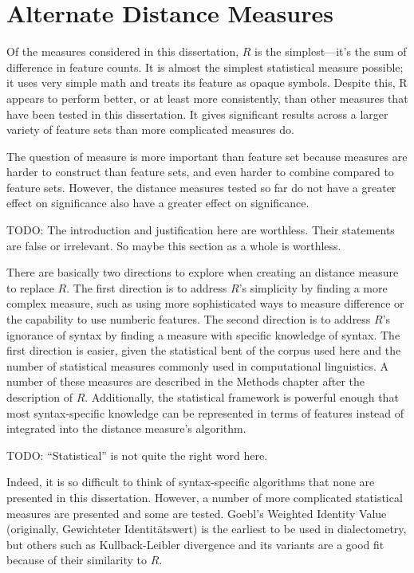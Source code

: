 \section{Alternate Distance Measures}

Of the measures considered in this dissertation, $R$ is the
simplest---it's the sum of difference in feature counts. It is almost
the simplest statistical measure possible; it uses very simple math
and treats its feature as opaque symbols.  Despite this, R appears to
perform better, or at least more consistently, than other measures
that have been tested in this dissertation. It gives significant
results across a larger variety of feature sets than more complicated
measures do.

The question of measure is more important than feature set because
measures are harder to construct than feature sets, and even harder to
combine compared to feature sets. However, the distance measures
tested so far do not have a greater effect on significance also have a
greater effect on significance.

TODO: The introduction and justification here are worthless. Their
statements are false or irrelevant. So maybe this section as a whole
is worthless.

There are basically two directions to explore when creating an
distance measure to replace $R$. The first direction is to address
$R$'s simplicity by finding a more complex measure, such as using more
sophisticated ways to measure difference or the capability to use
numberic features. The second direction is to address $R$'s ignorance
of syntax by finding a measure with specific knowledge of syntax. The
first direction is easier, given the statistical bent of the corpus
used here and the number of statistical measures commonly used in
computational linguistics. A number of these measures are described in
the Methods chapter after the description of $R$.  Additionally, the
statistical framework is powerful enough that most syntax-specific
knowledge can be represented in terms of features instead of
integrated into the distance measure's algorithm.

TODO: ``Statistical'' is not quite the right word here.

Indeed, it is so difficult to think of syntax-specific algorithms that
none are presented in this dissertation. However, a number of more
complicated statistical measures are presented and some are tested. Goebl's
Weighted Identity Value (originally, Gewichteter Identit\"atswert) is
the earliest to be used in dialectometry, but others such as
Kullback-Leibler divergence and its variants are a good fit because of
their similarity to $R$.

